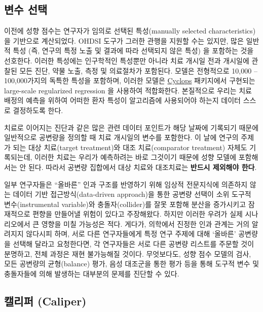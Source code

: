 \documentclass[11pt]{book}
\theoremstyle{definition}
\theoremstyle{definition}
\theoremstyle{definition}
\theoremstyle{remark}
\let\BeginKnitrBlock\begin \let\EndKnitrBlock\end
\begin{document}
\subsection{변수 선택}\label{VariableSelection}

이전에 성향 점수는 연구자가 임의로 선택된 특성(manually selected
characteristics)을 기반으로 계산되었다. OHDSI 도구가 그러한 관행을
지원할 수는 있지만, 많은 일반적 특성 (즉, 연구의 특정 노출 및 결과에
따라 선택되지 않은 특성) 을 포함하는 것을 선호한다. \citep{tian_2018}
이러한 특성에는 인구학적인 특성뿐만 아니라 치료 개시일 전과 개시일에
관찰된 모든 진단, 약물 노출, 측정 및 의료절차가 포함된다. 모델은
전형적으로 10,000 -- 100,000가지의 독특한 특성을 포함하며, 이러한 모델은
\href{https://ohdsi.github.io/Cyclops/}{Cyclops} 패키지에서 구현되는
large-scale regularized regression \citep{suchard_2013}을 사용하여
적합화한다. 본질적으로 우리는 치료 배정의 예측을 위하여 어떠한 환자
특성이 알고리즘에 사용되어야 하는지 데이터 스스로 결정하도록 한다.

\BeginKnitrBlock{rmdimportant}
치료로 이어지는 진단과 같은 많은 관련 데이터 포인트가 해당 날짜에
기록되기 때문에 일반적으로 공변량을 정의할 때 치료 개시일의 변수를
포함한다. 이 날에 연구의 주제가 되는 대상 치료(target treatment)와 대조
치료(comparator treatment) 자체도 기록되는데, 이러한 치료는 우리가
예측하려는 바로 그것이기 때문에 성향 모델에 포함해서는 안 된다. 따라서
공변량 집합에서 대상 치료와 대조치료는 \textbf{반드시 제외해야 한다}.
\EndKnitrBlock{rmdimportant}

일부 연구자들은 ``올바른'' 인과 구조를 반영하기 위해 임상적 전문지식에
의존하지 않는 데이터 기반 접근방식(data-driven approach)을 통한 공변량
선택이 소위 도구적 변수(instrumental variable)와 충돌자(collider)를 잘못
포함해 분산을 증가시키고 잠재적으로 편향을 만들어낼 위험이 있다고
주장해왔다. \citep{hernan_2002} 하지만 이러한 우려가 실제 시나리오에서
큰 영향을 미칠 가능성은 적다. \citep{schneeweiss_2018} 게다가, 의학에서
진정한 인과 관계는 거의 알려지지 않다시피 하며, 서로 다른 연구자들에게
특정 연구 주제에 대해 `올바른' 공변량을 선택해 달라고 요청한다면, 각
연구자들은 서로 다른 공변량 리스트를 주문할 것이 분명하고, 전체 과정은
재현 불가능해질 것이다. 무엇보다도, 성향 점수 모델의 검사, 모든 공변량의
균형(balance) 평가, 음성 대조군을 통한 평가 등을 통해 도구적 변수 및
충돌자들에 의해 발생하는 대부분의 문제를 진단할 수 있다.
 

\subsection{캘리퍼 (Caliper)}\label{-caliper}
\end{document}
